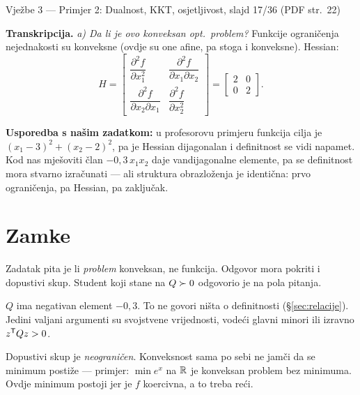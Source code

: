 \begin{izvor}{Vježbe 3 --- Primjer 2: Dualnost, KKT, osjetljivost, slajd 17/36 (PDF str.~22)}

\textbf{Transkripcija.} \emph{a) Da li je ovo konveksan opt.\ problem?}
Funkcije ograničenja nejednakosti su konveksne (ovdje su one afine, pa stoga i
konveksne). Hessian:
\[
H = \begin{bmatrix}
\dfrac{\partial^2 f}{\partial x_1^2} & \dfrac{\partial^2 f}{\partial x_1 \partial x_2} \\[8pt]
\dfrac{\partial^2 f}{\partial x_2 \partial x_1} & \dfrac{\partial^2 f}{\partial x_2^2}
\end{bmatrix}
= \begin{bmatrix} 2 & 0 \\ 0 & 2 \end{bmatrix} .
\]

\textbf{Usporedba s našim zadatkom:} u profesorovu primjeru funkcija cilja je
$(x_1-3)^2 + (x_2-2)^2$, pa je Hessian dijagonalan i definitnost se vidi
napamet. Kod nas mješoviti član $-0{,}3\,x_1x_2$ daje vandijagonalne elemente, pa
se definitnost mora stvarno izračunati --- ali struktura obrazloženja je
identična: prvo ograničenja, pa Hessian, pa zaključak.
\end{izvor}

\section{Zamke}
\label{sec:z1a-zamke}

\begin{zamka}
Zadatak pita je li \emph{problem} konveksan, ne funkcija. Odgovor mora pokriti i
dopustivi skup. Student koji stane na $Q \succ 0$ odgovorio je na pola pitanja.
\end{zamka}

\begin{zamka}
$Q$ ima negativan element $-0{,}3$. To ne govori ništa o definitnosti
(\S\ref{sec:relacije}). Jedini valjani argumenti su svojstvene vrijednosti,
vodeći glavni minori ili izravno $z^{\mathsf{T}} Q z > 0$.
\end{zamka}

\begin{zamka}
Dopustivi skup je \emph{neograničen}. Konveksnost sama po sebi ne jamči da se
minimum postiže --- primjer: $\min e^{x}$ na $\mathbb{R}$ je konveksan problem bez
minimuma. Ovdje minimum postoji jer je $f$ koercivna, a to treba reći.
\end{zamka}

